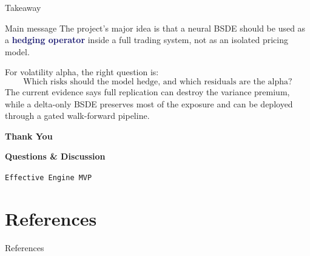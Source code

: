 \documentclass[11pt,aspectratio=169]{beamer}
\newcommand{\1}{\mathbf{1}}
\newcommand{\claim}[1]{\textcolor{midnightblue}{\textbf{#1}}}
\begin{document}
\begin{frame}{Takeaway}
    \small
    \begin{center}
    \begin{minipage}{0.82\textwidth}
    \begin{block}{Main message}
    The project's major idea is that a neural BSDE should be used as a \claim{hedging operator} inside a full trading system, not as an isolated pricing model.
    \end{block}
    \vspace{5pt}
    For volatility alpha, the right question is:
    \[
        \text{Which risks should the model hedge, and which residuals are the alpha?}
    \]
    The current evidence says full replication can destroy the variance premium, while a delta-only BSDE preserves most of the exposure and can be deployed through a gated walk-forward pipeline.
    \end{minipage}
    \end{center}
\end{frame}

\begin{frame}
    \vspace{30pt}
    \begin{center}
        {\Huge \color{midnightblue} \textbf{Thank You}}

        \vspace{20pt}
        {\large \textbf{Questions \& Discussion}}

        \vspace{14pt}
        {\small \texttt{Effective Engine MVP}}
    \end{center}
\end{frame}

\appendix
\section*{References}
\begin{frame}[allowframebreaks]{References}
    \scriptsize
    
    
\end{frame}
\end{document}
